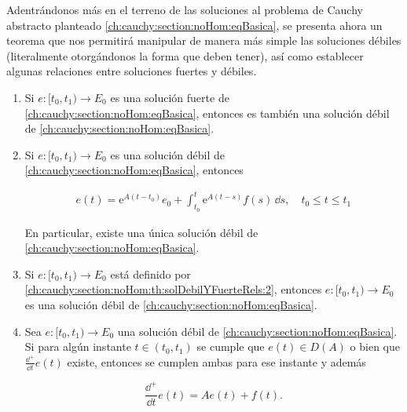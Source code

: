 Adentrándonos más en el terreno de las soluciones al problema de Cauchy abstracto planteado \eqref{ch:cauchy:section:noHom:eqBasica}, se presenta ahora un teorema que nos permitirá manipular de manera más simple las soluciones débiles (literalmente otorgándonos la forma que deben tener), así como establecer algunas relaciones entre soluciones fuertes y débiles.\\

\begin{Teorema}
    \label{ch:cauchy:section:noHom:th:solDebilYFuerteRels}

    \begin{enumerate}
        \item Si $e : [t_0, t_1) \rightarrow E_0$ es una solución fuerte de \eqref{ch:cauchy:section:noHom:eqBasica}, entonces es también una solución débil de \eqref{ch:cauchy:section:noHom:eqBasica}.

        \item Si $e : [t_0, t_1) \rightarrow E_0$ es una solución débil de \eqref{ch:cauchy:section:noHom:eqBasica}, entonces

        \begin{align}
            \label{ch:cauchy:section:noHom:th:solDebilYFuerteRels:2}
            e(t) = \mathrm{e}^{A(t-t_0)}e_0 + \int_{t_0}^{t}\mathrm{e}^{A(t-s)}f(s) \, \dd s, \quad t_0 \leq t \leq t_1
        \end{align}

        En particular, existe una única solución débil de \eqref{ch:cauchy:section:noHom:eqBasica}.

        \item Si $e : [t_0, t_1) \rightarrow E_0$ está definido por \eqref{ch:cauchy:section:noHom:th:solDebilYFuerteRels:2}, entonces $e : [t_0, t_1) \rightarrow E_0$ es una solución débil de \eqref{ch:cauchy:section:noHom:eqBasica}.

        \item Sea $e : [t_0, t_1) \rightarrow E_0$ una solución débil de \eqref{ch:cauchy:section:noHom:eqBasica}. Si para algún instante $t \in (t_0, t_1)$ se cumple que $e(t) \in D(A)$ o bien que $\displaystyle\frac{\dd^+}{\dd t}e(t)$ existe, entonces se cumplen ambas para ese instante y además

        \[\frac{\dd^+}{\dd t}e(t) = Ae(t) + f(t).\]
    \end{enumerate}
\end{Teorema}

